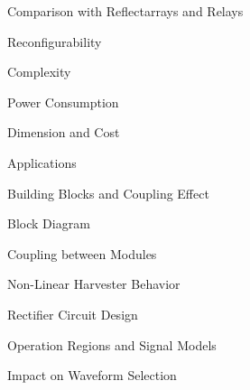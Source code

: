 \begin{section}{}
\begin{subsection}{Comparison with Reflectarrays and Relays}
		\begin{subsubsection}{Reconfigurability}

		\end{subsubsection}

		\begin{subsubsection}{Complexity}

		\end{subsubsection}

		\begin{subsubsection}{Power Consumption}

		\end{subsubsection}

		\begin{subsubsection}{Dimension and Cost}

		\end{subsubsection}

		\begin{subsubsection}{Applications}

		\end{subsubsection}
	\end{subsection}
\end{section}

\begin{section}{}
	\begin{subsection}{Building Blocks and Coupling Effect}
		\begin{subsubsection}{Block Diagram}

		\end{subsubsection}

		\begin{subsubsection}{Coupling between Modules}

		\end{subsubsection}
	\end{subsection}

	\begin{subsection}{Non-Linear Harvester Behavior}
		\begin{subsubsection}{Rectifier Circuit Design}

		\end{subsubsection}

		\begin{subsubsection}{Operation Regions and Signal Models}

		\end{subsubsection}

		\begin{subsubsection}{Impact on Waveform Selection}

		\end{subsubsection}
	\end{subsection}
\end{section}

